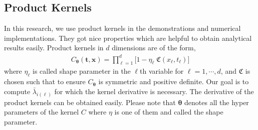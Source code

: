 \documentclass{svjour3}                     %
\newcommand{\bm}[1]{\boldsymbol{#1}}
\newcommand{\vtheta}{{\bm{\theta}}}
\newcommand{\vt}{\bm{t}}
\newcommand{\vx}{\bm{x}}
\begin{document}
\subsection{Product Kernels}
\label{sec:product_kernel}

In this research, we use product kernels in the demonstrations and numerical implementations. They got nice properties which are helpful to obtain analytical results easily. Product kernels in $d$ dimensions are of the form,
\begin{align}
\label{eqn:prod_kernel}
C_\vtheta(\vt, \vx) = 
\prod_{\ell=1}^d \biggl[ 1 - \eta_\ell \; \mathfrak{C}(x_\ell,t_\ell) \biggr]
\end{align}
where $\eta_\ell$ is called shape parameter in the $\ell$th variable for $\ell=1,\cdots,d$, and $\mathfrak{C}$ is chosen such that to ensure $C_{\vtheta}$ is symmetric and positive definite. Our goal is to compute $\bar{\lambda}_{i(\ell)}$ for which the kernel derivative is necessary. The derivative of the product kernels can be obtained easily. Please note that $\vtheta$ denotes all the hyper parameters of the kernel $C$ where $\eta$ is one of them and called the shape parameter.
\end{document}
